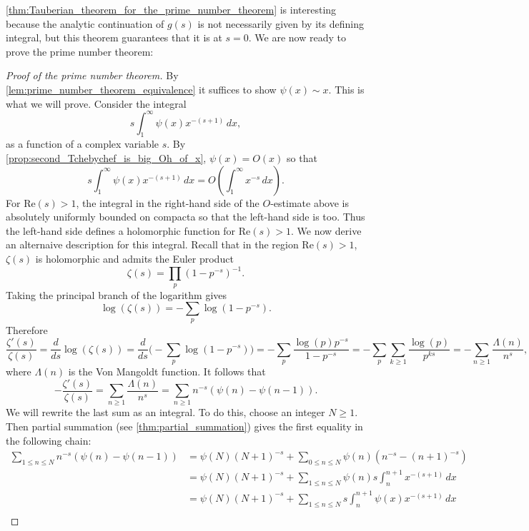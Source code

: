 \documentclass[12pt]{book}
\theoremstyle{definition}\newframedtheorem{method}{Method}
\newcommand{\z}{\zeta}
\renewcommand{\L}{\Lambda}
\newcommand{\<}{\langle}
\renewcommand{\>}{\rangle}
\renewcommand{\Re}{\mathrm{Re}}
\begin{document}
      \cref{thm:Tauberian_theorem_for_the_prime_number_theorem} is interesting because the analytic continuation of $g(s)$ is not necessarily given by its defining integral, but this theorem guarantees that it is at $s = 0$. We are now ready to prove the prime number theorem:

      \begin{proof}[Proof of the prime number theorem]
        By \cref{lem:prime_number_theorem_equivalence} it suffices to show $\psi(x) \sim x$. This is what we will prove. Consider the integral
        \[
          s\int_{1}^{\infty}\psi(x)x^{-(s+1)}\,dx,
        \]
        as a function of a complex variable $s$. By \cref{prop:second_Tchebychef_is_big_Oh_of_x}, $\psi(x) = O(x)$ so that
        \[
          s\int_{1}^{\infty}\psi(x)x^{-(s+1)}\,dx = O\left(\int_{1}^{\infty}x^{-s}\,dx\right).
        \]
        For $\Re(s) > 1$, the integral in the right-hand side of the $O$-estimate above is absolutely uniformly bounded on compacta so that the left-hand side is too. Thus the left-hand side defines a holomorphic function for $\Re(s) > 1$. We now derive an alternaive description for this integral. Recall that in the region $\Re(s) > 1$, $\z(s)$ is holomorphic and admits the Euler product
        \[
          \z(s) = \prod_{p}(1-p^{-s})^{-1}.
        \]
        Taking the principal branch of the logarithm gives
        \[
          \log(\z(s)) = -\sum_{p}\log(1-p^{-s}).
        \]
        Therefore
        \[
          \frac{\z'(s)}{\z(s)} = \frac{d}{ds}\log(\z(s)) = \frac{d}{ds}\bigg(-\sum_{p}\log(1-p^{-s})\bigg) = -\sum_{p}\frac{\log(p)p^{-s}}{1-p^{-s}} = -\sum_{p}\sum_{k \ge 1}\frac{\log(p)}{p^{ks}} = -\sum_{n \ge 1}\frac{\L(n)}{n^{s}},
        \]
        where $\L(n)$ is the Von Mangoldt function. It follows that
        \[
          -\frac{\z'(s)}{\z(s)} = \sum_{n \ge 1}\frac{\L(n)}{n^{s}} = \sum_{n \ge 1}n^{-s}(\psi(n)-\psi(n-1)).
        \]
        We will rewrite the last sum as an integral. To do this, choose an integer $N \ge 1$. Then partial summation (see \cref{thm:partial_summation}) gives the first equality in the following chain:
        \begin{align*}
          \sum_{1 \le n \le N}n^{-s}(\psi(n)-\psi(n-1)) &= \psi(N)(N+1)^{-s}+\sum_{0 \le n \le N}\psi(n)(n^{-s}-(n+1)^{-s}) \\
          &= \psi(N)(N+1)^{-s}+\sum_{1 \le n \le N}\psi(n)s\int_{n}^{n+1}x^{-(s+1)}\,dx \\
          &= \psi(N)(N+1)^{-s}+\sum_{1 \le n \le N}s\int_{n}^{n+1}\psi(x)x^{-(s+1)}\,dx \\

\end{align*}
\end{proof}
\end{document}
